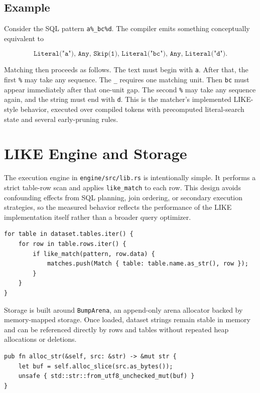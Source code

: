 \documentclass[11pt]{article}
\begin{document}
\subsection{Example}

Consider the SQL pattern \texttt{a\%\_bc\%d}. The compiler emits something conceptually equivalent to

\[
\texttt{Literal("a"), Any, Skip(1), Literal("bc"), Any, Literal("d")}.
\]

Matching then proceeds as follows. The text must begin with \texttt{a}. After that, the first \texttt{\%} may take any sequence. The \texttt{\_} requires one matching unit. Then \texttt{bc} must appear immediately after that one-unit gap. The second \texttt{\%} may take any sequence again, and the string must end with \texttt{d}. This is the matcher's implemented LIKE-style behavior, executed over compiled tokens with precomputed literal-search state and several early-pruning rules.

\section{LIKE Engine and Storage}
The execution engine in \texttt{engine/src/lib.rs} is intentionally simple. It performs a strict table-row scan and applies \texttt{like\_match} to each row. This design avoids confounding effects from SQL planning, join ordering, or secondary execution strategies, so the measured behavior reflects the performance of the LIKE implementation itself rather than a broader query optimizer. 

\begin{lstlisting}[style=ruststyle]
for table in dataset.tables.iter() {
    for row in table.rows.iter() {
        if like_match(pattern, row.data) {
            matches.push(Match { table: table.name.as_str(), row });
        }
    }
}
\end{lstlisting}

Storage is built around \texttt{BumpArena}, an append-only arena allocator backed by memory-mapped storage. Once loaded, dataset strings remain stable in memory and can be referenced directly by rows and tables without repeated heap allocations or deletions.

\begin{lstlisting}[style=ruststyle]
pub fn alloc_str(&self, src: &str) -> &mut str {
    let buf = self.alloc_slice(src.as_bytes());
    unsafe { std::str::from_utf8_unchecked_mut(buf) }
}
\end{lstlisting}
\end{document}
